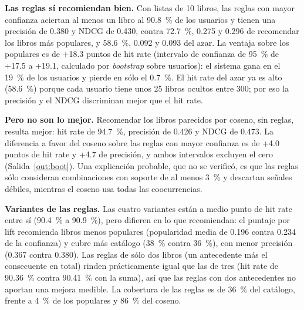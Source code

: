 \documentclass[11pt,letterpaper]{article}
\begin{document}
\textbf{Las reglas sí recomiendan bien.} Con listas de 10 libros, las reglas con mayor confianza aciertan al menos un libro al 90.8~\% de los usuarios y tienen una precisión de 0.380 y NDCG de 0.430, contra 72.7~\%, 0.275 y 0.296 de recomendar los libros más populares, y 58.6~\%, 0.092 y 0.093 del azar. La ventaja sobre los populares es de +18.3 puntos de hit rate (intervalo de confianza de 95~\% de +17.5 a +19.1, calculado por \textit{bootstrap} sobre usuarios): el sistema gana en el 19~\% de los usuarios y pierde en sólo el 0.7~\%. El hit rate del azar ya es alto (58.6~\%) porque cada usuario tiene unos 25 libros ocultos entre 300; por eso la precisión y el NDCG discriminan mejor que el hit rate.

\textbf{Pero no son lo mejor.} Recomendar los libros parecidos por coseno, sin reglas, resulta mejor: hit rate de 94.7~\%, precisión de 0.426 y NDCG de 0.473. La diferencia a favor del coseno sobre las reglas con mayor confianza es de +4.0 puntos de hit rate y +4.7 de precisión, y ambos intervalos excluyen el cero (Salida~\ref{out:boot}). Una explicación probable, que no se verificó, es que las reglas sólo consideran combinaciones con soporte de al menos 3~\% y descartan señales débiles, mientras el coseno usa todas las coocurrencias.

\textbf{Variantes de las reglas.} Las cuatro variantes están a medio punto de hit rate entre sí (90.4~\% a 90.9~\%), pero difieren en lo que recomiendan: el puntaje por lift recomienda libros menos populares (popularidad media de 0.196 contra 0.234 de la confianza) y cubre más catálogo (38~\% contra 36~\%), con menor precisión (0.367 contra 0.380). Las reglas de sólo dos libros (un antecedente más el consecuente en total) rinden prácticamente igual que las de tres (hit rate de 90.36~\% contra 90.41~\% con la suma), así que las reglas con dos antecedentes no aportan una mejora medible. La cobertura de las reglas es de 36~\% del catálogo, frente a 4~\% de los populares y 86~\% del coseno.
\end{document}
